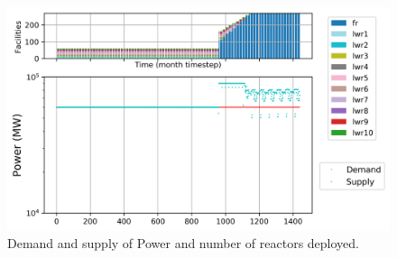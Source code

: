 \documentclass[11pt]{article}
\begin{document}
\begin{figure}[H]
	\centering
	\includegraphics[width=\textwidth]{23-figures/0-poly-power.png} 
	\hfill
	\caption{Demand and supply of Power and number of reactors deployed.}
	\label{fig:23-power}
\end{figure}
\end{document}
